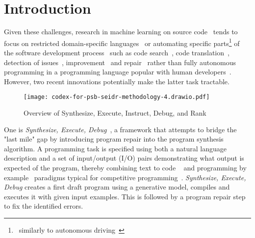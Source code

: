 
\section{Introduction}
\label{sec:intro}





Given these challenges, research in machine learning on source code~\cite{allamanis2018:survey} tends to focus on restricted domain-specific languages~\cite{chen2021:latent,flashmeta,liventsev2021:bf} or automating specific parts\footnote{~similarly to autonomous driving~\cite{grigorescu2020:survey,marcano2020:review}} of the software development process~\cite{lu2021:codexglue,niu2023:crosscodebench} such as code search~\cite{husain2020:codesearchnet}, code translation~\cite{roziere2020:unsupervised}, detection of issues~\cite{fernandes2016:reviewbased,chakraborty2021:deep}, improvement~\cite{petke2018:genetic} and repair~\cite{gouesAutomatedProgramRepair2019} rather than fully autonomous programming in a programming language popular with human developers~\cite{:tiobe}.
However, two recent innovations potentially make the latter task tractable.

\begin{figure*}
    \centering
    \texttt{[image: codex-for-psb-seidr-methodology-4.drawio.pdf]}
    \caption{Overview of Synthesize, Execute, Instruct, Debug, and Rank}
    \label{fig:method}
\end{figure*}

One is \emph{Synthesize, Execute, Debug}~\cite{guptaSynthesizeExecuteDebug2020}, a framework that attempts to bridge the "last mile" gap by introducing program repair into the program synthesis algorithm. 
A programming task is specified using both a natural language description and a set of input/output (I/O) pairs demonstrating what output is expected of the program, thereby combining text to code ~\cite{iyer2018:mapping} and programming by example~\cite{halbertProgrammingExample1984,gulwani2016:programming} paradigms typical for competitive programming~\cite{zavershynskyi2018:naps}.
\emph{Synthesize, Execute, Debug} creates a first draft program using a generative model, compiles and executes it with given input examples.
This is followed by a program repair step to fix the identified errors.

